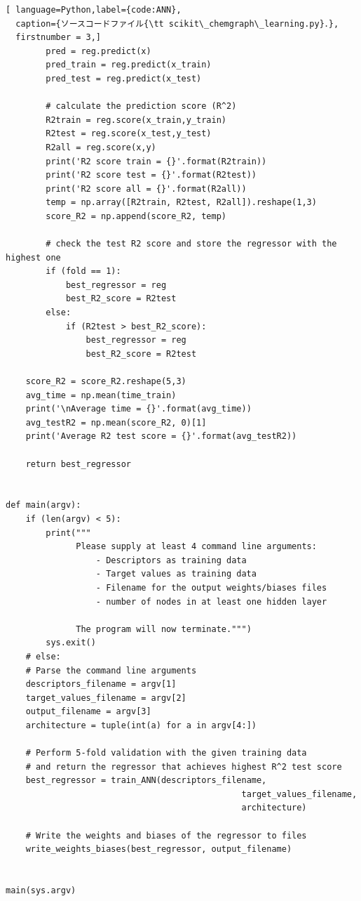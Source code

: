\documentclass[11pt,titlepage,dvipdfmx,twoside]{jarticle}
\begin{document}
\begin{lstlisting}[ language=Python,label={code:ANN},
  caption={ソースコードファイル{\tt scikit\_chemgraph\_learning.py}．},
  firstnumber = 3,]
        pred = reg.predict(x)
        pred_train = reg.predict(x_train)
        pred_test = reg.predict(x_test)
           
        # calculate the prediction score (R^2)
        R2train = reg.score(x_train,y_train)
        R2test = reg.score(x_test,y_test)
        R2all = reg.score(x,y) 
        print('R2 score train = {}'.format(R2train))
        print('R2 score test = {}'.format(R2test))
        print('R2 score all = {}'.format(R2all))
        temp = np.array([R2train, R2test, R2all]).reshape(1,3)
        score_R2 = np.append(score_R2, temp)
        
        # check the test R2 score and store the regressor with the highest one
        if (fold == 1):
            best_regressor = reg
            best_R2_score = R2test
        else:
            if (R2test > best_R2_score):
                best_regressor = reg
                best_R2_score = R2test

    score_R2 = score_R2.reshape(5,3)
    avg_time = np.mean(time_train)
    print('\nAverage time = {}'.format(avg_time))
    avg_testR2 = np.mean(score_R2, 0)[1]
    print('Average R2 test score = {}'.format(avg_testR2))
    
    return best_regressor


def main(argv):
    if (len(argv) < 5):
        print("""
              Please supply at least 4 command line arguments:
                  - Descriptors as training data
                  - Target values as training data
                  - Filename for the output weights/biases files
                  - number of nodes in at least one hidden layer
                  
              The program will now terminate.""")
        sys.exit()
    # else:
    # Parse the command line arguments
    descriptors_filename = argv[1]
    target_values_filename = argv[2]
    output_filename = argv[3]
    architecture = tuple(int(a) for a in argv[4:])
    
    # Perform 5-fold validation with the given training data
    # and return the regressor that achieves highest R^2 test score
    best_regressor = train_ANN(descriptors_filename,
                                               target_values_filename,
                                               architecture)
    
    # Write the weights and biases of the regressor to files
    write_weights_biases(best_regressor, output_filename)
    
    
main(sys.argv)
\end{lstlisting}
\end{document}
